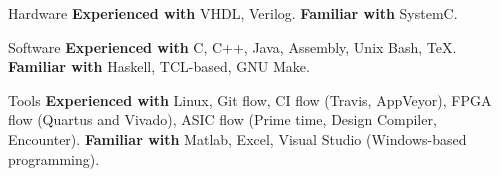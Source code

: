 
\begin{cvskills}

\cvskill
{Hardware}
{\textbf{Experienced with} VHDL, Verilog. \textbf{Familiar with} SystemC.}

\cvskill
{Software}
{\textbf{Experienced with} C, C++, Java, Assembly, Unix Bash, TeX. 
\textbf{Familiar with} Haskell, TCL-based, GNU Make.}

\cvskill
{Tools}
{\textbf{Experienced with} Linux, Git flow, CI flow (Travis, AppVeyor), FPGA 
flow (Quartus and Vivado), ASIC flow (Prime time, Design Compiler, Encounter). 
\textbf{Familiar with} Matlab, Excel, Visual Studio (Windows-based 
programming).}

\end{cvskills}